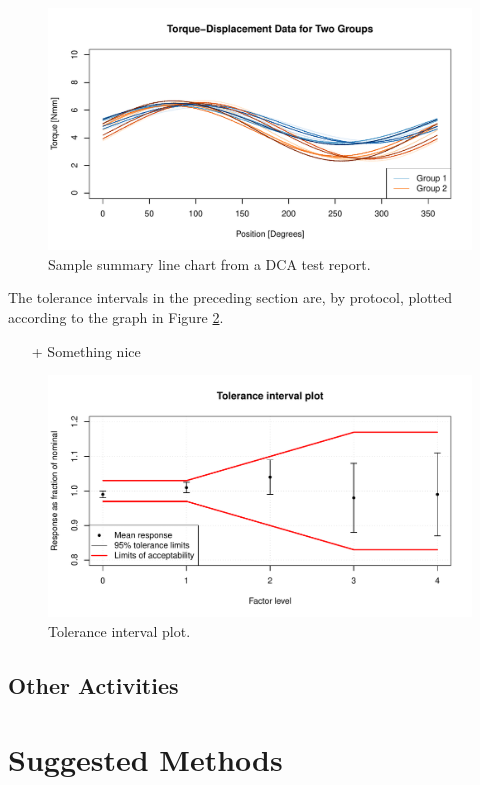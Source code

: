 \documentclass[11pt,a4paper,article]{memoir} %
\begin{document}
\begin{figure}
	\includegraphics[width=\textwidth]{overlaid_line_chart.pdf}
	\caption{Sample summary line chart from a DCA test report.}
	\label{fig:line_plots}
\end{figure}
The tolerance intervals in the preceding section are, by protocol, plotted according to the graph in Figure \ref{fig:tolerance_intervals_plot}. 
\begin{itemize}
\item[+] Something nice
\end{itemize}
\begin{figure}
	\includegraphics[width=\textwidth]{tolerance_intervals_plot.pdf}
	\caption{Tolerance interval plot.}
	\label{fig:tolerance_intervals_plot}
\end{figure}

\section{Other Activities}

\chapter{Suggested Methods}\label{suggested_methods}
\end{document}
